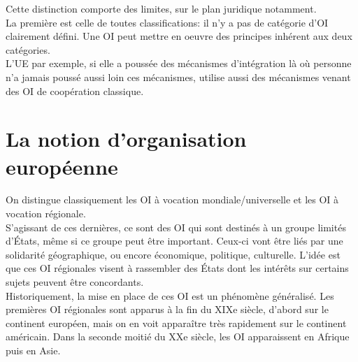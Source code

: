 \documentclass[10pt, a4paper, openany]{book}
\begin{document}
Cette distinction comporte des limites, sur le plan juridique notamment. \\
La première est celle de toutes classifications: il n'y a pas de catégorie d'OI clairement défini. Une OI peut mettre en oeuvre des principes inhérent aux deux catégories. \\
L'UE par exemple, si elle a poussée des mécanismes d'intégration là où personne n'a jamais poussé aussi loin ces mécanismes, utilise aussi des mécanismes venant des OI de coopération classique. 

\section{La notion d'organisation européenne}

On distingue classiquement les OI à vocation mondiale/universelle et les OI à vocation régionale. \\
S'agissant de ces dernières, ce sont des OI qui sont destinés à un groupe limités d'États, même si ce groupe peut être important. Ceux-ci vont être liés par une solidarité géographique, ou encore économique, politique, culturelle. L'idée est que ces OI régionales visent à rassembler des États dont les intérêts sur certains sujets peuvent être concordants. \\
Historiquement, la mise en place de ces OI est un phénomène généralisé. Les premières OI régionales sont apparus à la fin du XIXe siècle, d'abord sur le continent européen, mais on en voit apparaître très rapidement sur le continent américain. Dans la seconde moitié du XXe siècle, les OI apparaissent en Afrique puis en Asie. 
\end{document}
